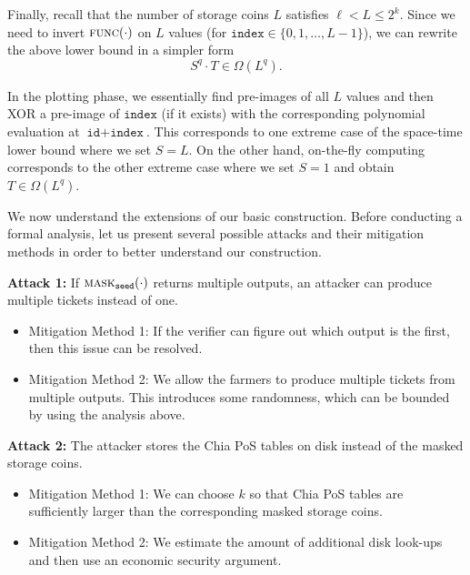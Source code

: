 \documentclass[12pt,draftcls,onecolumn]{IEEEtran}
\newcommand{\id}{\texttt{id}}
\newcommand{\seed}{\texttt{seed}}
\newcommand{\ind}{\texttt{index}}
\newcommand{\mask}{\textsc{mask}}
\newcommand{\func}{\textsc{func}}
\begin{document}

Finally, recall that the number of storage coins $L$ satisfies $\ell < L \le 2^k$. Since we need to invert $\func(\cdot)$ on $L$ values (for $\ind \in \{0, 1, \ldots, L - 1 \}$), we can rewrite the above lower bound in a simpler form 
\[
S^q \cdot T \in \Omega\left(L^q \right).
\]

In the plotting phase, we essentially find pre-images of all $L$ values  and then XOR a pre-image of $\ind$ (if it exists) with the corresponding polynomial evaluation at $\id + \ind$. 
This corresponds to one extreme case of the space-time lower bound where we set $S = L$.
On the other hand, on-the-fly computing corresponds to the other extreme case where we set $S = 1$ and obtain $T \in \Omega\left(L^q \right)$.


We now understand the extensions of our basic construction. Before conducting a formal analysis, let us present several possible attacks and their mitigation methods in order to better understand our construction.

{\bf Attack 1:} If $\mask_{\seed}(\cdot)$ returns multiple outputs, an attacker can produce multiple tickets instead of one.

\begin{itemize}
    \item Mitigation Method 1: If the verifier can figure out which output is the first, then this issue can be resolved.
    \item Mitigation Method 2: We allow the farmers to produce multiple tickets from multiple outputs. This introduces some randomness, which can be bounded by using the analysis above.
\end{itemize}

{\bf Attack 2:} The attacker stores the Chia PoS tables on disk instead of the masked storage coins.

\begin{itemize}
    \item Mitigation Method 1: We can choose $k$ so that Chia PoS tables are sufficiently larger than the corresponding masked storage coins.
    \item Mitigation Method 2: We estimate the amount of additional disk look-ups and then use an economic security argument.
\end{itemize}
\end{document}
